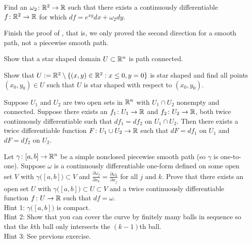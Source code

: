 \begin{exercise}
Find an $\omega_2 \colon {\mathbb{R}}^2 \to {\mathbb{R}}$ such that
there exists a continuously differentiable $f \colon {\mathbb{R}}^2 \to {\mathbb{R}}$
for which
$df = e^{xy} dx + \omega_2 dy$.
\end{exercise}

\begin{exercise}
Finish the proof of , that is, we only proved the
second direction for a smooth path, not a piecewise smooth path.
\end{exercise}

\begin{exercise}
Show that a star shaped domain $U \subset {\mathbb{R}}^n$ is path connected.
\end{exercise}

\begin{exercise}
Show that $U := {\mathbb{R}}^2 \setminus \{ (x,y) \in {\mathbb{R}}^2 : x \leq 0, y=0 \}$ is
star shaped and find all points $(x_0,y_0) \in U$ such that
$U$ is star shaped with respect to $(x_0,y_0)$.
\end{exercise}

\begin{exercise}
Suppose $U_1$ and $U_2$ are two open sets in ${\mathbb{R}}^n$ with $U_1 \cap U_2$
nonempty and connected.
Suppose there exists an $f_1 \colon U_1 \to {\mathbb{R}}$ and
$f_2 \colon U_2 \to {\mathbb{R}}$, both twice continuously differentiable
such that $d f_1 = d f_2$ on $U_1 \cap U_2$.
Then there exists a twice differentiable function $F \colon U_1 \cup U_2 \to
{\mathbb{R}}$ such that $dF = df_1$ on $U_1$ and $dF = df_2$ on $U_2$.
\end{exercise}

\begin{exercise}[Hard]
Let $\gamma \colon [a,b] \to {\mathbb{R}}^n$ be a simple nonclosed piecewise smooth
path (so $\gamma$
is one-to-one).  Suppose $\omega$ is a continuously differentiable
one-form defined on some open
set $V$ with $\gamma\bigl([a,b]\bigr) \subset V$ and
$\frac{\partial \omega_j}{\partial x_k} = \frac{\partial \omega_k}{\partial
x_j}$
for all $j$ and $k$.  Prove that there exists an open set $U$
with $\gamma\bigl([a,b]\bigr) \subset U \subset V$ and
a twice continuously differentiable function $f \colon U \to {\mathbb{R}}$
such that $df = \omega$.
\\
Hint 1: $\gamma\bigl([a,b]\bigr)$ is compact.\\
Hint 2: Show that you can cover the curve by finitely many balls in sequence
so that the $k$th ball only intersects the $(k-1)$th ball.\\
Hint 3: See previous exercise.
\end{exercise}

